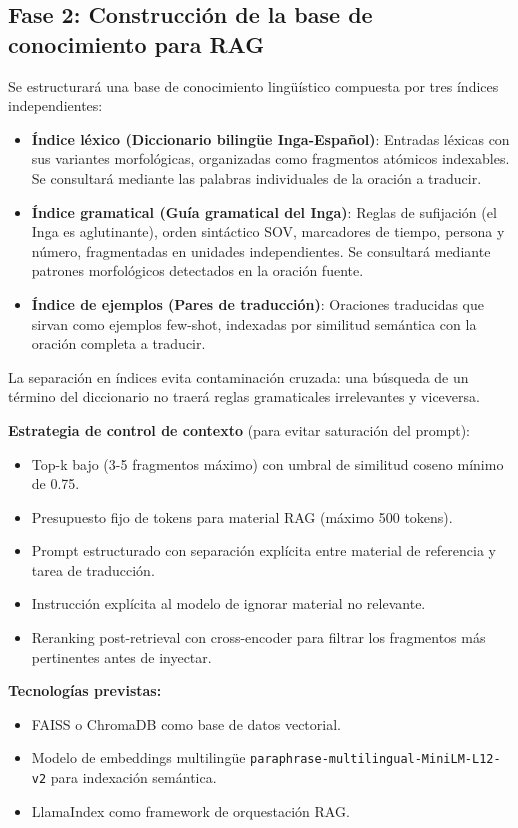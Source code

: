 \documentclass[12pt,a4paper]{article}
\begin{document}
\subsection{Fase 2: Construcción de la base de conocimiento para RAG}

Se estructurará una base de conocimiento lingüístico compuesta por tres índices independientes:

\begin{itemize}
    \item \textbf{Índice léxico (Diccionario bilingüe Inga-Español)}: Entradas léxicas con sus variantes morfológicas, organizadas como fragmentos atómicos indexables. Se consultará mediante las palabras individuales de la oración a traducir.

    \item \textbf{Índice gramatical (Guía gramatical del Inga)}: Reglas de sufijación (el Inga es aglutinante), orden sintáctico SOV, marcadores de tiempo, persona y número, fragmentadas en unidades independientes. Se consultará mediante patrones morfológicos detectados en la oración fuente.

    \item \textbf{Índice de ejemplos (Pares de traducción)}: Oraciones traducidas que sirvan como ejemplos few-shot, indexadas por similitud semántica con la oración completa a traducir.
\end{itemize}

La separación en índices evita contaminación cruzada: una búsqueda de un término del diccionario no traerá reglas gramaticales irrelevantes y viceversa.

\textbf{Estrategia de control de contexto} (para evitar saturación del prompt):
\begin{itemize}
    \item Top-k bajo (3-5 fragmentos máximo) con umbral de similitud coseno mínimo de 0.75.
    \item Presupuesto fijo de tokens para material RAG (máximo 500 tokens).
    \item Prompt estructurado con separación explícita entre material de referencia y tarea de traducción.
    \item Instrucción explícita al modelo de ignorar material no relevante.
    \item Reranking post-retrieval con cross-encoder para filtrar los fragmentos más pertinentes antes de inyectar.
\end{itemize}

\textbf{Tecnologías previstas:}
\begin{itemize}
    \item FAISS o ChromaDB como base de datos vectorial.
    \item Modelo de embeddings multilingüe \texttt{paraphrase-multilingual-MiniLM-L12-v2} para indexación semántica.
    \item LlamaIndex como framework de orquestación RAG.
\end{itemize}
\end{document}
